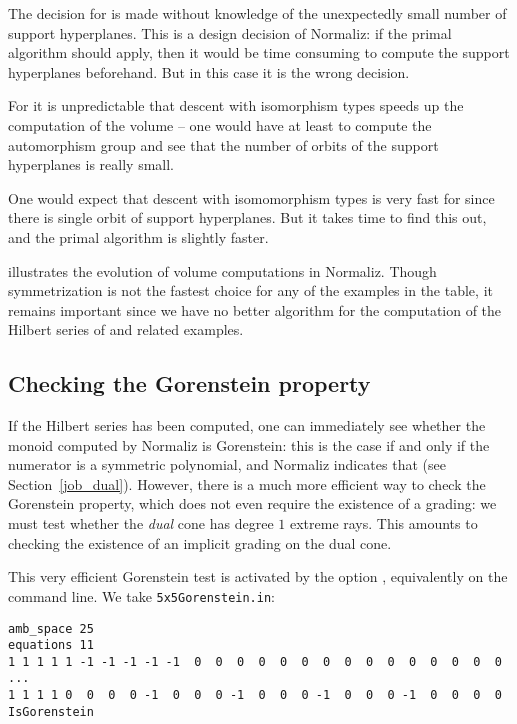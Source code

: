The decision for  is made without knowledge of the unexpectedly small number of support hyperplanes. This is a design decision of Normaliz: if the primal algorithm should apply, then it would be time consuming to compute the support hyperplanes beforehand. But in this case it is the wrong decision. 

For  it is unpredictable that descent with isomorphism types speeds up the computation of the volume -- one would have at least to compute the automorphism group and see that the number of orbits of the support hyperplanes is really small.

One would expect that descent with isomomorphism types is very fast for  since there is single orbit of support hyperplanes. But it takes time to find this out, and the primal algorithm is slightly faster.

 illustrates the evolution of volume computations in Normaliz. Though symmetrization is not the fastest choice for any of the examples in the table, it remains important since we have no better algorithm for the computation of the Hilbert series of  and related examples.

\subsection{Checking the Gorenstein property}\label{Gorenstein}

If the Hilbert series has been computed, one can immediately see whether the monoid computed by Normaliz is Gorenstein: this is the case if and only if the numerator is a symmetric polynomial, and Normaliz indicates that (see Section~\ref{job_dual}). However, there is a much more efficient way to check the Gorenstein property, which does not even require the existence of a grading: we must test whether the \emph{dual} cone has degree $1$ extreme rays. This amounts to checking the existence of an implicit grading on the dual cone.

This very efficient Gorenstein test is activated by the option , equivalently  on the command line. We take \verb|5x5Gorenstein.in|:

\begin{Verbatim}
amb_space 25
equations 11
1 1 1 1 1 -1 -1 -1 -1 -1  0  0  0  0  0  0  0  0  0  0  0  0  0  0  0
...
1 1 1 1 0  0  0  0 -1  0  0  0 -1  0  0  0 -1  0  0  0 -1  0  0  0  0
IsGorenstein
\end{Verbatim}

